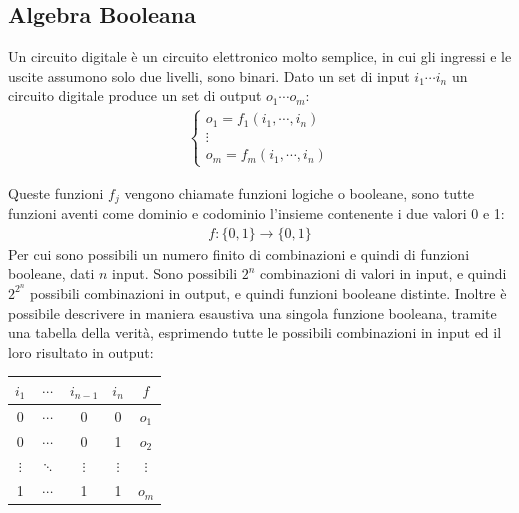 \documentclass{article}
\numberwithin{equation}{subsection}
\begin{document}
\subsection{Algebra Booleana}

Un circuito digitale è un circuito elettronico molto semplice, in cui gli ingressi e le uscite assumono solo due livelli, sono binari. Dato un set di input $i_1\cdots i_n$ un circuito digitale produce un set di 
output $o_1\cdots o_m$:
\begin{gather*}
    \begin{cases}
        o_1=f_1(i_1,\cdots,i_n)\\
        \vdots\\
        o_m=f_m(i_1,\cdots,i_n)
    \end{cases}
\end{gather*}

Queste funzioni $f_j$ vengono chiamate funzioni logiche o booleane, sono tutte funzioni aventi come dominio e codominio l'insieme contenente i due valori 0 e 1:
\begin{gather*}
    f:\{0,1\}\to\{0,1\}
\end{gather*}
Per cui sono possibili un numero finito di combinazioni e quindi di funzioni booleane, dati $n$ input. Sono possibili $2^n$ combinazioni di valori in input, e quindi $2^{2^n}$ possibili combinazioni in output, e quindi 
funzioni booleane distinte. Inoltre è possibile descrivere in maniera esaustiva una singola funzione booleana, tramite una tabella della verità, esprimendo tutte le possibili combinazioni in input ed il loro 
risultato in output:
\begin{center}
    \begin{tabular}{|c|c|c|c||c|}
        \hline
        $i_1$ &$\cdots$&$i_{n-1}$&$i_n$&$f$\\
        \hline\hline
        0&$\cdots$&0&0&$o_1$\\
        \hline
        0&$\cdots$&0&1&$o_2$\\
        \hline
        $\vdots$&$\ddots$&$\vdots$&$\vdots$&$\vdots$\\
        \hline
        1&$\cdots$&1&1&$o_m$\\
        \hline
    \end{tabular}
\end{center}
\end{document}
